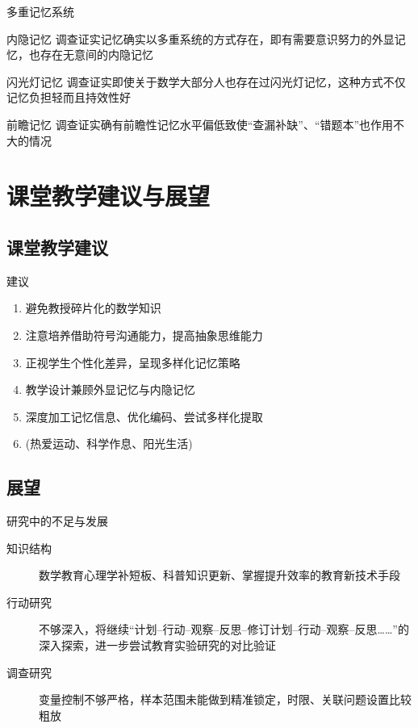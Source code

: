 \documentclass[serif]{beamer}
\begin{document}
    \begin{frame}{多重记忆系统}
         \begin{block}{内隐记忆}
        	调查证实记忆确实以多重系统的方式存在，即有需要意识努力的外显记忆，也存在无意间的内隐记忆
         \end{block}
         \pause
         \begin{block}{闪光灯记忆}
    	    调查证实即使关于数学大部分人也存在过闪光灯记忆，这种方式不仅记忆负担轻而且持效性好
         \end{block}
         \pause
         \begin{block}{前瞻记忆}
	        调查证实确有前瞻性记忆水平偏低致使“查漏补缺”、“错题本”也作用不大的情况
         \end{block}
    \end{frame}
    
    \section{课堂教学建议与展望}
    \subsection{课堂教学建议}
    \begin{frame}{建议}
       \begin{enumerate}
       	\item 避免教授碎片化的数学知识
       	\item 注意培养借助符号沟通能力，提高抽象思维能力
       	\item 正视学生个性化差异，呈现多样化记忆策略
       	\item 教学设计兼顾外显记忆与内隐记忆
       	\item 深度加工记忆信息、优化编码、尝试多样化提取
       	\item (热爱运动、科学作息、阳光生活)
       \end{enumerate}
    \end{frame}

    \subsection{展望}
    \begin{frame}{研究中的不足与发展}
        \begin{description}
        	\item[知识结构] 数学教育心理学补短板、科普知识更新、掌握提升效率的教育新技术手段
        	\item[行动研究] 不够深入，将继续“计划--行动--观察--反思--修订计划--行动--观察--反思……”的深入探索，进一步尝试教育实验研究的对比验证
        	\item[调查研究] 变量控制不够严格，样本范围未能做到精准锁定，时限、关联问题设置比较粗放
        \end{description}   
    \end{frame}
    
\end{document}
